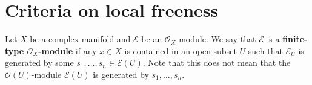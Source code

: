 \documentclass[12pt,b5paper,notitlepage]{report}
\theoremstyle{definition}
\theoremstyle{plain}
\newcommand{\mc}{\mathcal}
\newcommand{\wht}{\widehat}
\newcommand{\scr}{\mathscr}
\newcommand{\mbb}{\mathbb}
\newcommand{\blt}{\bullet}
\newcommand{\Cbb}{\mathbb C}
\numberwithin{equation}{section}
\begin{document}















\section{Criteria on local freeness}


Let $X$ be a complex manifold and $\scr E$ be an $\scr O_X$-module. We say that $\scr E$ is a \textbf{finite-type $\scr O_X$-module} if any $x\in X$ is contained in an open subset $U$ such that $\scr E_U$ is  generated by some $s_1,\dots,s_n\in\scr E(U)$. Note that this does not mean that the $\scr O(U)$-module $\scr E(U)$ is generated by $s_1,\dots,s_n$.
\end{document}
